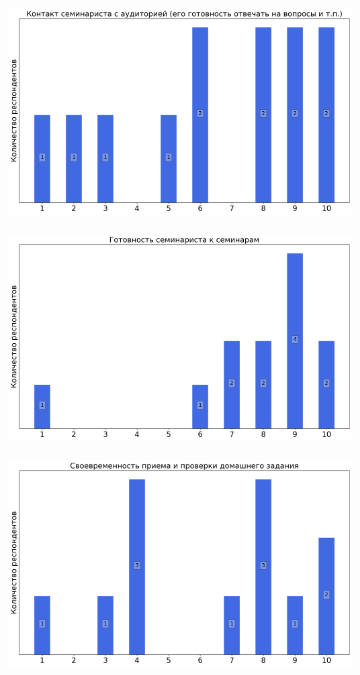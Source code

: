 		\begin{figure}[H]
			\centering
			\begin{subfigure}[b]{0.45\textwidth}
				\centering
				\includegraphics[width=\textwidth]{images/3 course/Теория поля/seminarists-marks-Осипов Д.Л.-0.png}
			\end{subfigure}
			\begin{subfigure}[b]{0.45\textwidth}
				\centering
				\includegraphics[width=\textwidth]{images/3 course/Теория поля/seminarists-marks-Осипов Д.Л.-1.png}
			\end{subfigure}
			\begin{subfigure}[b]{0.45\textwidth}
				\centering
				\includegraphics[width=\textwidth]{images/3 course/Теория поля/seminarists-marks-Осипов Д.Л.-2.png}

\end{subfigure}
\end{figure}
